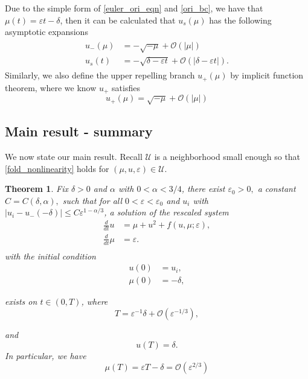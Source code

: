 \documentclass[letterpaper,11pt]{article}
\newcommand{\rmO}{\mathcal{O}}
\newcommand{\eps}{\varepsilon}
\numberwithin{equation}{section}
\theoremstyle{plain}
\newtheorem{theorem}{Theorem}[section]
\begin{document}
Due to the simple form of \eqref{euler_ori_eqn} and \eqref{ori_bc}, we have that $\mu(t)= \eps t-\delta$, then it can be calculated that $u_s(\mu)$ has the following asymptotic expansions
\begin{align}\label{singularAsy}
\begin{split}
u_-(\mu) &= -\sqrt{-\mu} + \rmO(|\mu|)\\
u_s(t) &= -\sqrt{\delta-\eps t} + \rmO(|\delta-\eps t|).
\end{split}
\end{align}
Similarly, we also define the upper repelling branch $u_+(\mu)$ by implicit function theorem, where we know $u_+$ satisfies
\begin{equation}
u_+(\mu) = \sqrt{-\mu} + \rmO(|\mu|) 
\end{equation}

\subsection{Main result - summary} \label{main_sum}

We now state our main result. Recall $\mathcal{U}$ is a neighborhood small enough so that \eqref{fold_nonlinearity} holds for $(\mu, u , \eps) \in \mathcal{U}$.

\begin{theorem}\label{thm:main}
Fix $\delta>0$ and $\alpha$ with $0<\alpha <3/4$, there exist $\eps_0>0,$ a constant $C=C(\delta,\alpha),$ such that for all $0<\eps<\eps_0$ and $u_i$ with $|u_i -u_-(-\delta) | \le C\eps^{1-\alpha/3}$, a solution of the rescaled system 
\begin{equation}\label{main_eqn}
\begin{split}
\frac{d}{dt}u &= \mu+u^2+ f(u,\mu;\eps), \\
\frac{d}{dt} \mu &= \eps.  \\
\end{split}
\end{equation}
with the initial condition
\begin{equation}\label{main_ic}
\begin{split}
u(0) &= u_i, \\
\mu(0) &= -\delta,
\end{split}
\end{equation}

exists on $t \in (0,T)$, where
\begin{equation}
T = \eps^{-1}\delta + \rmO(\eps^{-1/3}),
\end{equation}

and 
\begin{equation}
 u(T) = \delta.
\end{equation}
In particular, we have 
\begin{equation}
\mu(T) = \eps T -\delta = \rmO(\eps^{2/3})
\end{equation}
\end{theorem}
\end{document}
